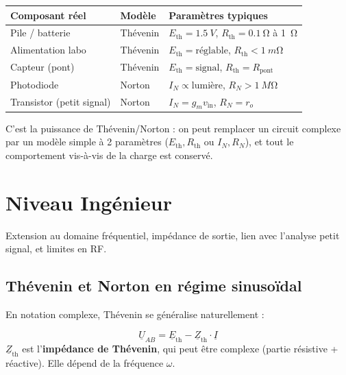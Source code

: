 \documentclass[12pt,a4paper,twoside]{book}
\begin{document}
\begin{center}
\begin{tabular}{lll}
\toprule
\textbf{Composant réel} & \textbf{Modèle} & \textbf{Paramètres typiques} \\
\midrule
Pile / batterie & Thévenin & $E_{\text{th}} = \SI{1.5}{V}$, $R_{\text{th}} = \SI{0.1}{\ohm}$ à \SI{1}{\ohm} \\
Alimentation labo & Thévenin & $E_{\text{th}} = \text{réglable}$, $R_{\text{th}} < \SI{1}{m\ohm}$ \\
Capteur (pont) & Thévenin & $E_{\text{th}} = \text{signal}$, $R_{\text{th}} = R_{\text{pont}}$ \\
Photodiode & Norton & $I_N \propto \text{lumière}$, $R_N > \SI{1}{M\ohm}$ \\
Transistor (petit signal) & Norton & $I_N = g_m v_{\text{in}}$, $R_N = r_o$ \\
\bottomrule
\end{tabular}
\end{center}

\begin{intuition}
C'est la puissance de Thévenin/Norton : on peut remplacer un circuit complexe par un modèle simple à 2 paramètres ($E_{\text{th}}, R_{\text{th}}$ ou $I_N, R_N$), et tout le comportement vis-à-vis de la charge est conservé.
\end{intuition}

\section{Niveau Ingénieur}

\begin{ingenieur}
Extension au domaine fréquentiel, impédance de sortie, lien avec l'analyse petit signal, et limites en RF.
\end{ingenieur}

\subsection{Thévenin et Norton en régime sinusoïdal}

En notation complexe, Thévenin se généralise naturellement :

\begin{formule}
\[
\boxed{\underline{U}_{AB} = \underline{E}_{\text{th}} - \underline{Z}_{\text{th}} \cdot \underline{I}}
\]
$\underline{Z}_{\text{th}}$ est l'\textbf{impédance de Thévenin}, qui peut être complexe (partie résistive + réactive). Elle dépend de la fréquence $\omega$.
\end{formule}
\end{document}
